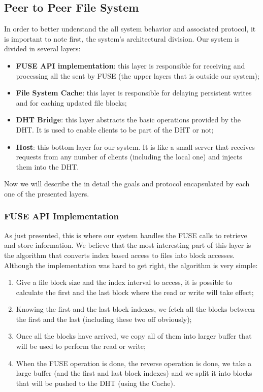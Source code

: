 \documentclass[times,9pt,article]{llncs}
\begin{document}
\subsection{Peer to Peer File System}
In order to better understand the all system behavior and associated protocol, it is important  to note first, the system's architectural division. Our system is divided in several layers:

\begin{itemize}
\item \textbf{FUSE API implementation}: this layer is responsible for receiving and processing all the sent by FUSE (the upper layers that is outside our system);
\item \textbf{File System Cache}: this layer is responsible for delaying persistent writes and for caching updated file blocks;
\item \textbf{DHT Bridge}: this layer abstracts the basic operations provided by the DHT. It is used to enable clients to be part of the DHT or not;
\item \textbf{Host}: this bottom layer for our system. It is like a small server that receives requests from any number of clients (including the local one) and injects them into the DHT.
\end{itemize}

Now we will describe the in detail the goals and protocol encapsulated by each one of the presented layers.

\subsubsection{FUSE API Implementation}

As just presented, this is where our system handles the FUSE calls to retrieve and store information. We believe that the most interesting part of this layer is the algorithm that converts index based access to files into block accesses. Although the implementation was hard to get right, the algorithm is very simple:

\begin{enumerate}
\item Give a file block size and the index interval to access, it is possible to calculate the first and the last block where the read or write will take effect;
\item Knowing the first and the last block indexes, we fetch all the blocks between the first and the last (including these two off obviously);
\item Once all the blocks have arrived, we copy all of them into larger buffer that will be used to perform the read or write;
\item When the FUSE operation is done, the reverse operation is done, we take a large buffer (and the first and last block indexes) and we split it into blocks that will be pushed to the DHT (using the Cache).
\end{enumerate}
\end{document}
